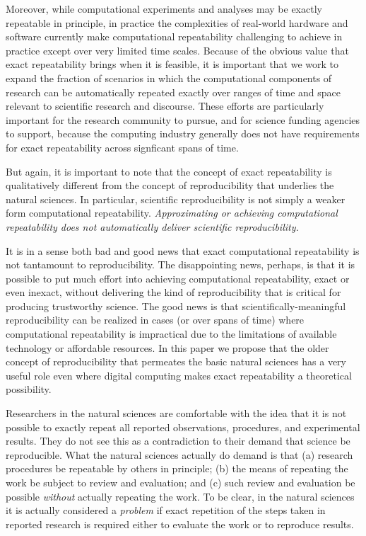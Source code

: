 Moreover, while computational experiments and analyses may be exactly repeatable in principle, 
	in practice the complexities of real-world hardware and software currently make computational repeatability 
	challenging to achieve in practice except over very limited time scales.
Because of the obvious value that exact repeatability brings when it is feasible, it is important that we work to
	expand the fraction of scenarios in which the computational components of research can be automatically 
	repeated exactly over ranges of time and space relevant to scientific research and discourse.
These efforts are particularly important for the research community to pursue, and for science funding
	agencies to support, because the computing industry generally does not have requirements for exact 
	repeatability across signficant spans of time.

But again, it is important to note  that the concept of exact repeatability is 
	qualitatively different from the concept of reproducibility that underlies the natural sciences.
In particular, scientific reproducibility is not simply a weaker form computational repeatability.  
\emph{Approximating or achieving computational repeatability does not automatically deliver scientific reproducibility.}

It is in a sense both bad and good news that exact computational repeatability is not tantamount to reproducibility.
The disappointing news, perhaps, is that it is possible to put much effort into achieving computational repeatability,
	exact or even inexact,
	without delivering the kind of reproducibility that is critical for producing trustworthy science.
The good news is that scientifically-meaningful reproducibility can be realized in cases (or over spans of time)
	where computational repeatability is impractical due to the limitations of available technology or affordable resources.
In this paper we propose that the older concept of reproducibility that permeates the basic natural sciences has a very
	useful role even where digital computing makes exact repeatability a theoretical possibility.

 Researchers in the natural sciences are comfortable with the idea that it is not possible to exactly
	repeat all reported observations, procedures, and experimental results.
They do not see this as a contradiction to their demand that science be reproducible.
What the natural sciences actually do demand is that 
	(a) research procedures be repeatable by others in principle;
	(b) the means of repeating the work be subject to review and evaluation; 
	and (c) such review and evaluation be possible \emph{without} actually repeating the work.
To be clear, in the natural sciences it is actually considered a \emph{problem} if exact repetition of the steps
	taken in reported research is required either to evaluate the work or to reproduce results.

